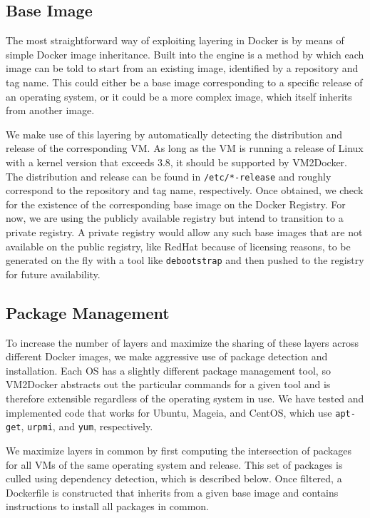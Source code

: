 \subsection{Base Image}
\label{sec:osdetection}
The most straightforward way of exploiting layering in Docker is by means of simple Docker image inheritance. Built into the engine is a method by which each image can be told to start from an existing image, identified by a repository and tag name. This could either be a base image corresponding to a specific release of an operating system, or it could be a more complex image, which itself inherits from another image.

We make use of this layering by automatically detecting the distribution and release of the corresponding VM. As long as the VM is running a release of Linux with a kernel version that exceeds 3.8, it should be supported by VM2Docker. The distribution and release can be found in \texttt{/etc/*-release} and roughly correspond to the repository and tag name, respectively. Once obtained, we check for the existence of the corresponding base image on the Docker Registry. For now, we are using the publicly available registry but intend to transition to a private registry. A private registry would allow any such base images that are not available on the public registry, like RedHat because of licensing reasons, to be generated on the fly with a tool like \texttt{debootstrap} \cite{debootstrap} and then pushed to the registry for future availability.

\subsection{Package Management}
\label{sec:packagemanagement}

To increase the number of layers and maximize the sharing of these layers across different Docker images, we make aggressive use of package detection and installation. Each OS has a slightly different package management tool, so VM2Docker abstracts out the particular commands for a given tool and is therefore extensible regardless of the operating system in use. We have tested and implemented code that works for Ubuntu, Mageia, and CentOS, which use \texttt{apt-get}, \texttt{urpmi}, and \texttt{yum}, respectively.

We maximize layers in common by first computing the intersection of packages for all VMs of the same operating system and release. This set of packages is culled using dependency detection, which is described below. Once filtered, a Dockerfile is constructed that inherits from a given base image and contains instructions to install all packages in common.

